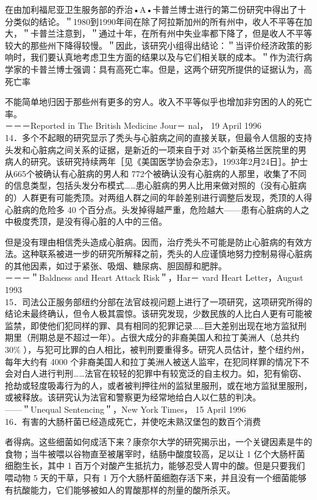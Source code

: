 在由加利福尼亚卫生服务部的乔治•A•卡普兰博士进行的第二份研究中得出了十分类似的结论。＂1980到1990年间在除了阿拉斯加州的所有州中，收人不平等在加大，＂卡普兰注意到，＂通过十年，在所有州中失业率都下降了，但是收人不平等较大的那些州下降得较慢。＂因此，该研究小组得出结论：＂当评价经济政策的影响时，我们要认真地考虑卫生方面的结果以及与它们相关联的成本。＂作为流行病学家的卡普兰博士强调：具有高死亡率。但是，这两个研究所提供的证据认为，高死亡率

不能简单地归因于那些州有更多的穷人。收入不平等似乎也增加非穷困的人的死亡率。\\
－－－Reported in The British Medicine Jour－ nal， 19 April 1996\\
14．多个不起眼的研究显示了秃头与心脏病之间的直接关联，但最令人信服的支持头发和心脏病之间关系的证据，是新近的一项来自于对 35个新英格兰医院里的男病人的研究。该研究持续两年［见《美国医学协会杂志》，1993年2月24日］。护士从665个被确认有心脏病的男人和 772个被确认没有心脏病的人那里，收集了不同的信息类型，包括头发分布模式……患心脏病的男人比用来做对照的（没有心脏病的）人群更有可能秃顶。对两组人群之间的年龄差别进行调整后发现，秃顶的人得心脏病的危险多 40 个百分点。头发掉得越严重，危险越大——患有心脏病的人之中极度秃顶，是没有得心脏的人中的三倍。

但是没有理由相信秃头造成心脏病。因而，治疗秃头不可能是防止心脏病的有效方法。这种联系被进一步的研究所解释之前，秃头的人应谨慎地努力控制易得心脏病的其他因素，如过于紧张、吸烟、糖尿病、胆固醇和肥胖。\\
－－－＂Baldness and Heart Attack Risk＂，Har－ vard Heart Letter，August 1993\\
15．司法公正服务部纽约分部在法官歧视问题上进行了一项研究，这项研究所得的结论未最终确认，但令人极其震惊。该研究发现，少数民族的人比白人更有可能被监禁，即使他们犯同样的罪、具有相同的犯罪记录……巨大差别出现在地方监狱刑期里（刑期总是不超过一年）。占很大成分的非裔美国人和拉丁美洲人（总共约 $30 \%$ ），与犯可比罪的白人相比，被判刑要重得多。研究人员估计，整个纽约州，每年大约有 4000 个非裔美国人和拉丁美洲人被送人监牢，在犯同样罪的情况下不会对白人进行判刑……法官在较轻的犯罪中有较宽泛的自主权力。如，犯有偷窃、抢劫或轻度吸毒行为的人，或者被判押往州的监狱里服刑，或在地方监狱里服刑，或被释放。该研究认为法官和警察更为经常地给白人以仁慈的判决。\\
——＂Unequal Sentencing＂，New York Times， 15 April 1996\\
16．有害的大肠杆菌已经造成死亡，并使吃未熟汉堡包的数百个消费

者得病。这些细菌如何成活下来？康奈尔大学的研究揭示出，一个关键因素是牛的食物；当牛被喂以谷物直至被屠宰时，结肠中酸度较高，足以让 1 亿个大肠杆菌细胞生长，其中 1 百万个对酸产生抵抗力，能够忍受人胃中的酸。但是只要我们喂动物 5 天的干草，只有 1 万个大肠杆菌细胞存活下来，并且没有一个细菌能够有抗酸能力，它们能够被如人的胃酸那样的剂量的酸所杀灭。


